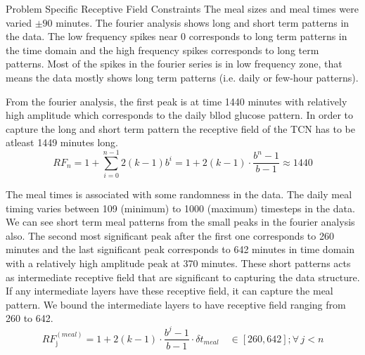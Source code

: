 \documentclass[8pt,xcolor=dvipsnames,compress]{beamer}
\begin{document}
% 
\begin{frame}{Problem Specific Receptive Field Constraints}
\footnotesize
The meal sizes and meal times were varied $\pm 90$ minutes. The fourier analysis shows long and short term patterns in the data. The low frequency spikes near 0 corresponds to long term patterns in the time domain and the high frequency spikes corresponds to long term patterns. Most of the spikes in the fourier series is in low frequency zone, that means the data mostly shows long term patterns (i.e. daily or few-hour patterns).

\noindent From the fourier analysis, the first peak is at time 1440 minutes with relatively high amplitude which corresponds to the daily bllod glucose pattern. In order to capture the long and short term pattern the receptive field of the TCN has to be atleast 1449 minutes long.  
\begin{equation}
RF_n = 1 + \sum_{i=0}^{n-1} 2(k - 1)b^i = 1 + 2(k - 1) \cdot \frac{b^n - 1}{b - 1} \approx 1440
\end{equation}

\vspace{0.5em}
\noindent The meal times is associated with some randomness in the data. The daily meal timing varies between 109 (minimum) to 1000 (maximum) timesteps in the data. We can see short term meal patterns from the small peaks in the fourier analysis also. The second most significant peak after the first one corresponds to 260 minutes and the last significant peak corresponds to 642 minutes in time domain with a relatively high amplitude peak at 370 minutes. These short patterns acts as intermediate receptive field that are significant to capturing the data structure. If any intermediate layers have these receptive field, it can capture the meal pattern. We bound the intermediate layers to have receptive field ranging from 260 to 642.
\begin{equation}
RF_{\text{j}}^{(meal)} = 1 + 2(k - 1) \cdot \frac{b^j - 1}{b - 1} \cdot \delta t_{meal} \quad \in [260,642];\forall\, j < n
\end{equation}

\end{frame}
\end{document}
